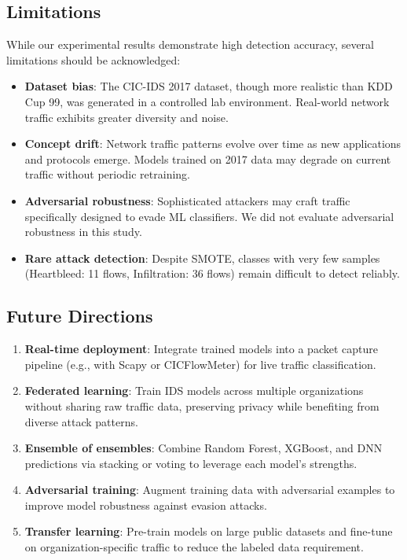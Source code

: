 \subsection{Limitations}

While our experimental results demonstrate high detection accuracy, several limitations should be acknowledged:

\begin{itemize}
    \item \textbf{Dataset bias}: The CIC-IDS 2017 dataset, though more realistic than KDD Cup 99, was generated in a controlled lab environment. Real-world network traffic exhibits greater diversity and noise.
    \item \textbf{Concept drift}: Network traffic patterns evolve over time as new applications and protocols emerge. Models trained on 2017 data may degrade on current traffic without periodic retraining.
    \item \textbf{Adversarial robustness}: Sophisticated attackers may craft traffic specifically designed to evade ML classifiers. We did not evaluate adversarial robustness in this study.
    \item \textbf{Rare attack detection}: Despite SMOTE, classes with very few samples (Heartbleed: 11 flows, Infiltration: 36 flows) remain difficult to detect reliably.
\end{itemize}

\subsection{Future Directions}

\begin{enumerate}
    \item \textbf{Real-time deployment}: Integrate trained models into a packet capture pipeline (e.g., with Scapy or CICFlowMeter) for live traffic classification.
    \item \textbf{Federated learning}: Train IDS models across multiple organizations without sharing raw traffic data, preserving privacy while benefiting from diverse attack patterns.
    \item \textbf{Ensemble of ensembles}: Combine Random Forest, XGBoost, and DNN predictions via stacking or voting to leverage each model's strengths.
    \item \textbf{Adversarial training}: Augment training data with adversarial examples to improve model robustness against evasion attacks.
    \item \textbf{Transfer learning}: Pre-train models on large public datasets and fine-tune on organization-specific traffic to reduce the labeled data requirement.
\end{enumerate}

